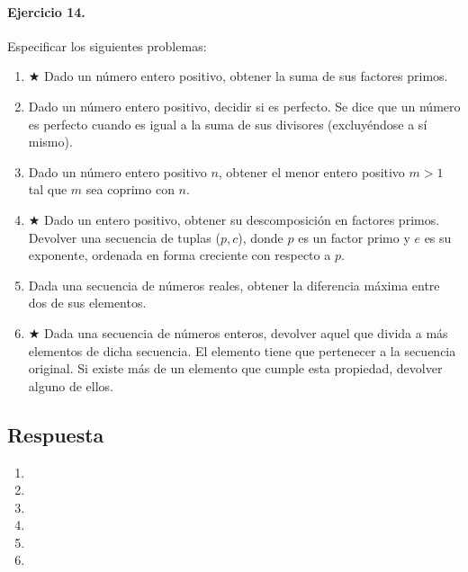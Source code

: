 \documentclass[a4paper]{article}
\begin{document}
\paragraph*{Ejercicio 14.} Especificar los siguientes problemas:
	\begin{enumerate}[label=\alph*)]
		\item $\bigstar$ Dado un número entero positivo, obtener la suma de sus factores primos.
		\item Dado un número entero positivo, decidir si es perfecto. Se dice que un número es
				perfecto cuando es igual a la suma de sus divisores (excluyéndose a sí mismo).
		\item Dado un número entero positivo $n$, obtener el menor entero positivo $m>1$ tal que
				$m$ sea coprimo con $n$.
		\item $\bigstar$ Dado un entero positivo, obtener su descomposición en factores primos.
			 	Devolver una secuencia de tuplas ($p,c$), donde $p$ es un factor primo y $e$ es su
			 	exponente, ordenada en forma creciente con respecto a $p$.
		\item Dada una secuencia de números reales, obtener la diferencia máxima entre dos de sus
				elementos.
		\item $\bigstar$ Dada una secuencia de números enteros, devolver aquel que divida a más
				elementos de dicha secuencia. El elemento tiene que pertenecer a la secuencia
				original. Si existe más de un elemento que cumple esta propiedad, devolver alguno 
				de ellos.
	\end{enumerate}
\subsection*{Respuesta}
	\begin{enumerate}[label=\alph*)]
		\item
		\item
		\item
		\item
		\item
		\item
	\end{enumerate}
	
\end{document}
